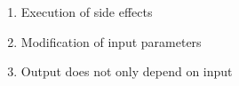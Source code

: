\begin{enumerate}[<+->]
  \item Execution of side effects
  \item Modification of input parameters
  \item Output does not only depend on input 
\end{enumerate}
